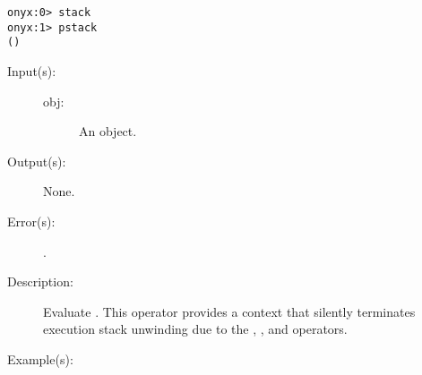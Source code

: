 \begin{description}
\begin{description}
\begin{verbatim}
onyx:0> stack
onyx:1> pstack
()
		\end{verbatim}
	\end{description}
\label{systemdict:start}
\item[{\onyxop{obj}{start}{--}}: ]
	\begin{description}\item[]
	\item[Input(s): ]
		\begin{description}\item[]
		\item[obj: ]
			An object.
		\end{description}
	\item[Output(s): ] None.
	\item[Error(s): ]
		\begin{description}\item[]
		\item[.]
		\end{description}
	\item[Description: ]
		Evaluate .  This operator provides a context that
		silently terminates execution stack unwinding due to the
		,
		, and
		 operators.
	\item[Example(s): ]\begin{verbatim}


\end{verbatim}
\end{description}
\end{description}

